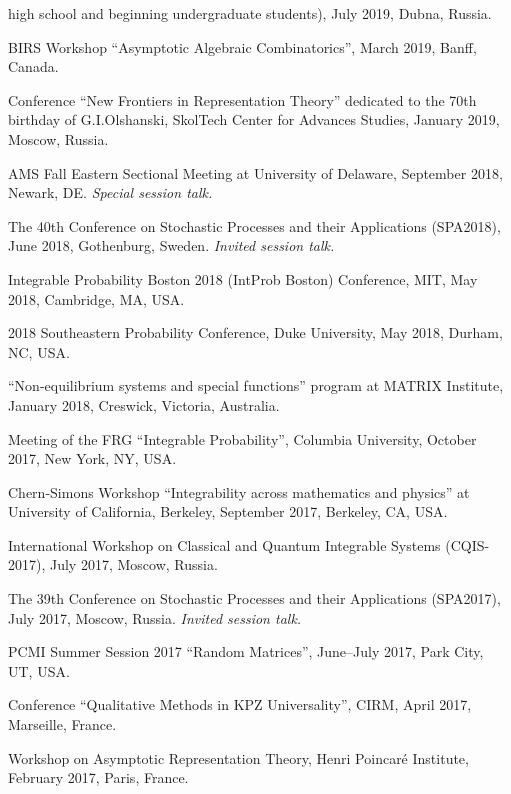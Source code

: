 \documentclass[letterpaper,11pt]{article}
\begin{document}
\begin{etaremune}
		high school and beginning undergraduate students), 
		July 2019, Dubna, Russia.
	\item
		BIRS Workshop ``Asymptotic Algebraic Combinatorics'',
		March 2019, Banff, Canada.
	\item Conference ``New Frontiers in Representation Theory'' dedicated to the 70th birthday of G.I.Olshanski, SkolTech Center for Advances Studies, January 2019, Moscow, Russia.
\item AMS Fall Eastern Sectional Meeting
	at University of Delaware,
	September 2018, Newark, DE.
		\emph{Special session talk.}
	\item
    The 40th Conference on Stochastic Processes and their
    Applications (SPA2018), June 2018, 
		Gothenburg, Sweden.
		\emph{Invited session talk.}
	\item
		Integrable Probability Boston 2018 (IntProb Boston)
		Conference, 
		MIT,
		May 2018, 
		Cambridge, MA, USA.
	\item
		2018 Southeastern Probability Conference,
		Duke University, 
		May 2018,
		Durham, NC, USA.
	\item 
		``Non-equilibrium systems and special functions'' program at MATRIX Institute, 
		January 2018, 
		Creswick, Victoria, Australia.
	\item 
		Meeting of the 
		FRG ``Integrable Probability'', Columbia University,
		October 2017, New York, NY, USA.

	\item Chern-Simons Workshop
		``Integrability across mathematics and physics'' 
		 at University of California, Berkeley,
			September 2017, Berkeley, CA, USA.
	\item
	      International Workshop on Classical and Quantum Integrable
	      Systems (CQIS-2017), July 2017, Moscow, Russia.
	\item
	      The 39th Conference on Stochastic Processes and their
	      Applications (SPA2017), July 2017, Moscow, Russia.
				\emph{Invited session talk.}

	\item
	      PCMI Summer Session 2017 ``Random Matrices'', June--July 2017,
	      Park City, UT, USA.

	\item
	      Conference ``Qualitative Methods in KPZ Universality'', CIRM,
	      April 2017, Marseille, France.

	\item
	      Workshop on Asymptotic Representation Theory, Henri Poincar\'e
	      Institute, February 2017, Paris, France.


\end{etaremune}
\end{document}
